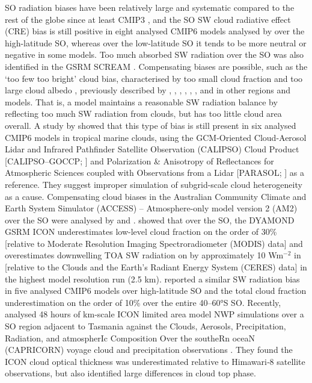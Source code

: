 \documentclass[12pt,a4paper]{article}
\begin{document}
SO radiation biases have been relatively large and systematic compared to the
rest of the globe since at least CMIP3 \citep{trenberth2010}, and the SO SW
cloud radiative effect (CRE) bias is still positive in eight analysed CMIP6
models analysed by \cite{schuddeboom2021} over the high-latitude SO, whereas over
the low-latitude SO it tends to be more neutral or negative in some models. Too
much absorbed SW radiation over the SO was also identified in the GSRM SCREAM
\cite{caldwell2021}. Compensating biases are possible, such as the `too few too
bright' cloud bias, characterised by too small cloud fraction and too large
cloud albedo \citep{wall2017,kuma2020}, previously described by
\cite{webb2001}, \cite{weare2004}, \cite{zhang2005}, \cite{karlsson2008},
\cite{nam2012}, \cite{klein2013}, and \cite{bender2017} in other regions and
models. That is, a model maintains a reasonable SW radiation balance by
reflecting too much SW radiation from clouds, but has too little cloud
area overall. A study by \cite{konsta2022} showed that this type of bias is still
present in six analysed CMIP6 models in tropical marine clouds, using the
GCM-Oriented Cloud-Aerosol Lidar and Infrared Pathfinder Satellite Observation
(CALIPSO) Cloud Product [CALIPSO--GOCCP; \cite{chepfer2010}] and Polarization
\& Anisotropy of Reflectances for Atmospheric Sciences coupled with
Observations from a Lidar [PARASOL; \cite{lier2008}] as a reference. They
suggest improper simulation of subgrid-scale cloud heterogeneity as a cause.
Compensating cloud biases in the Australian Community Climate and Earth System
Simulator (ACCESS) – Atmosphere-only model version 2 (AM2) over the SO were
analysed by \cite{fiddes2022} and \cite{fiddes2024}.  \cite{possner2022} showed
that over the SO, the DYAMOND GSRM ICON underestimates low-level cloud fraction
on the order of 30\% [relative to Moderate Resolution Imaging
Spectroradiometer (MODIS) data] and overestimates downwelling TOA SW radiation on
by approximately 10 Wm$^\mathrm{-2}$ in  [relative to the Clouds and the Earth’s
Radiant Energy System (CERES) data] in the highest model resolution run (2.5 km).
\cite{zhao2022} reported a similar SW radiation bias in five analysed CMIP6
models over high-latitude SO and the total cloud fraction underestimation on
the order of 10\% over the entire 40--60°S SO. Recently, \cite{ramadoss2024}
analysed 48 hours of km-scale ICON limited area model NWP simulations over a SO
region adjacent to Tasmania against the Clouds, Aerosols, Precipitation,
Radiation, and atmospherIc Composition Over the southeRn oceaN (CAPRICORN)
voyage cloud and precipitation observations \cite{mcfarquhar2021}. They found the ICON cloud optical
thickness was underestimated relative to Himawari‐8 satellite observations, but
also identified large differences in cloud top phase.
\end{document}
